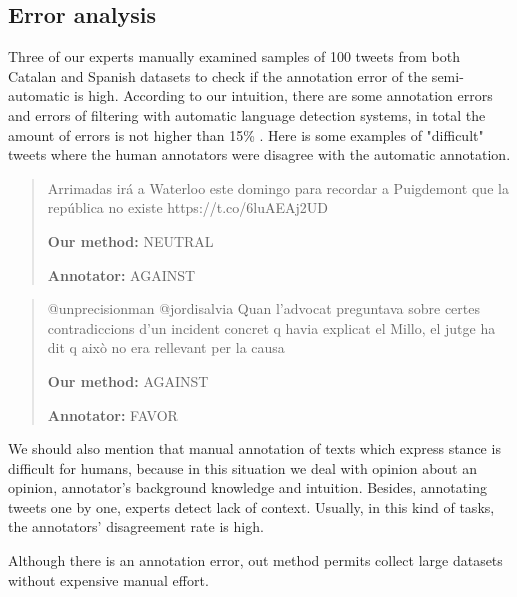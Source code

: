 \documentclass[10pt, a4paper]{article}
\begin{document}
\subsection{Error analysis}\label{sec:error}

Three of our experts manually examined samples of 100 tweets from both Catalan and Spanish datasets to check if the annotation error of the semi-automatic is high. According to our intuition, there are some annotation errors and errors of filtering with automatic language detection systems, in total the amount of errors is not higher than 15\% . Here is some examples of "difficult" tweets where the human annotators were disagree with the automatic annotation.    

\begin{quote}
Arrimadas ir\'a a Waterloo este domingo para recordar a Puigdemont que  la rep\'ublica no existe  https://t.co/6luAEAj2UD

\textbf{Our method:} NEUTRAL

\textbf{Annotator:} AGAINST
\end{quote}


\begin{quote}
@unprecisionman @jordisalvia Quan l'advocat preguntava sobre certes contradiccions d'un incident concret q havia explicat el Millo, el jutge ha dit q aix\`o no era rellevant per la causa

\textbf{Our method:} AGAINST

\textbf{Annotator:} FAVOR
\end{quote}

We should also mention that manual annotation of texts which express stance is difficult for humans, because in this situation we deal with opinion about an opinion, annotator's background knowledge and intuition. Besides, annotating tweets one by one, experts detect lack of context. Usually, in this kind of tasks, the annotators' disagreement rate is high. 

Although there is an annotation error, out method permits collect large datasets without expensive manual effort. 


\end{document}
